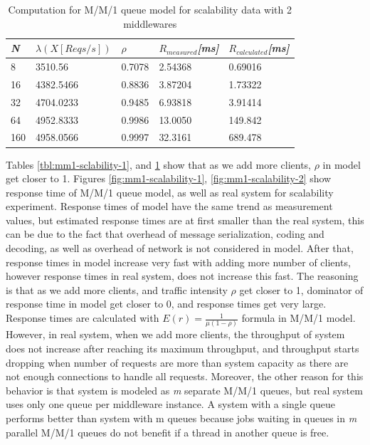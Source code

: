 \documentclass[11pt]{article}
\begin{document}
\begin{table}[!ht]
  \begin{tabular}{*5l}    \toprule
   \emph{N} & \emph{$\lambda(X[Reqs/s])$} &  \emph{$\rho$}  & \emph{$R_{measured}$[ms]} & \emph{$R_{calculated}$[ms]}\\\midrule
8   & 3510.56   & 0.7078 &  2.54368& 0.69016 \\
16  & 4382.5466 & 0.8836 &  3.87204& 1.73322 \\
32  & 4704.0233 & 0.9485 &  6.93818& 3.91414 \\
64  & 4952.8333 & 0.9986 &  13.0050& 149.842 \\
160 & 4958.0566 & 0.9997 &  32.3161& 689.478 \\
\hline
  \end{tabular}
  \centering
  \caption{Computation for M/M/1 queue model for scalability data with 2 middlewares}
  \label{tbl:mm1-sclability-2}
\end{table}

Tables \ref{tbl:mm1-sclability-1}, and \ref{tbl:mm1-sclability-2} show that as we add more clients, $\rho$ in 
model get closer to 1. Figures \ref{fig:mm1-scalability-1}, \ref{fig:mm1-scalability-2} show response time of M/M/1 queue
model, as well as real system for scalability experiment. Response times of model have the same trend as measurement values,
but estimated response times are at first smaller than the real system, this can be due to the fact that overhead
of message serialization, coding and decoding, as well as overhead of network is not considered in model. After that, 
response times in model increase very fast with adding more number of clients, however response times in real system,
does not increase this fast. The reasoning is that as we add more clients, and traffic intensity $\rho$ get closer to 1,  
dominator of response time in model get closer to 0, and response times get very large. Response times are calculated with
$E(r)=\frac{1}{\mu(1-\rho)}$ formula in M/M/1 model. However, in real system, when we add more clients, 
the throughput of system does not increase after reaching its maximum throughput, and throughput starts dropping 
when number of requests are more than system capacity as there are not enough connections to handle all
requests. 
Moreover, the other reason for this behavior is that system is modeled as 
\emph{m} separate M/M/1 queues, but real system uses only one queue per middleware instance.
A system with a single queue performs better than system with m queues because 
jobs waiting in queues in \emph{m} parallel M/M/1 queues do not benefit if a thread in another queue is free.
\end{document}
